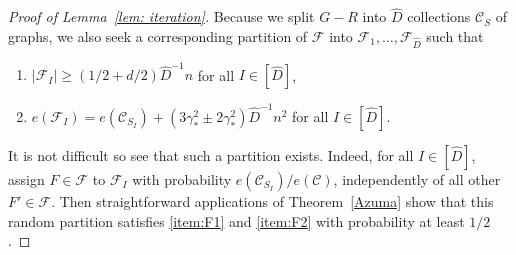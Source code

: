 \documentclass[a4paper, 11pt, reqno]{amsart}
\numberwithin{equation}{section}
\newcommand{\1}{{\rm 1\hspace*{-0.4ex}%
\rule{0.1ex}{1.52ex}\hspace*{0.2ex}}}
\newcommand{\cF}{\mathcal{F}}
\newcommand{\cC}{\mathcal{C}}
\newcommand{\I}{I}
\newcommand{\COMMENT}[1]{}
\begin{document}
\begin{proof}[Proof of Lemma~\ref{lem: iteration}]
Because we split $G- R$ into $\hat{D}$ collections $\cC_S$ of graphs, 
we also seek a corresponding partition of $\cF$ into $\cF_{1},\dots, \cF_{\hat{D}}$ such that 
\begin{enumerate}[label=(F\arabic*)]
\item\label{item:F1} $|\cF_{\I}|\geq (1/2+d/2)\hat{D}^{-1}n$ for all $\I\in [\hat{D}]$,
\item\label{item:F2} $e(\cF_{\I}) = e(\cC_{S_\I}) + (3\gamma_*^2 \pm 2\gamma_*^2)\hat{D}^{-1} n^2$ for all $\I\in [\hat{D}]$.
\end{enumerate}
It is not difficult so see that such a partition exists.
Indeed, for all $\I\in [\hat{D}]$, 
assign $F\in \cF$ to $\cF_\I$ with probability $e(\cC_{S_\I})/e(\cC)$, independently of all other $F'\in \cF$.
Then straightforward applications of Theorem~\ref{Azuma} show that this random partition satisfies \ref{item:F1} and \ref{item:F2} with probability at least $1/2$.\COMMENT{
Fix some $c$ small enough.
Let $F_1,\dots, F_{|\cF|}$ be the forests and for each $j\in [|\cF|]$, let $x_j \in [\hat{D}]$ be a random variable such that $\mathbb{P}[x_j=\I] = e(\cC_{S_\I})/e(\cC)$ such that $x_1,\dots, x_{|\cF|}$ are independent random variables.
And we assign $F_j$ into $\cF_{x_j}$.
We fix $\I\in [\hat{D}]$ consider exposure martingales $X_j:= \mathbb{E}[e(\cF_\I)\mid x_1,\dots, x_{j-1}]$ and $Y_j:= \mathbb{E}[|\cF_\I|\mid x_1,\dots, x_{j-1}]$.
Note that
\begin{align*}
	e(\cF)=e(G)+e(H_1)+e(H_2)+(3\gamma_*^2\pm\gamma_*^2)n^2
	= e(G) +(3\gamma_*^2\pm \gamma_*^2 \pm \gamma_*^3)n^2
	=e(\cC)+(3\gamma_*^2\pm \gamma_*^2 \pm 2\gamma_*^3)n^2.
\end{align*}
Then 
\begin{align*}
	X_1 
	= e(\cC_{S_\I}) + (3\gamma_*^2\pm\gamma_*^2\pm 2\gamma_*^3)n^2\frac{e(\cC_{S_\I})}{e(\cC)}
	= e(\cC_{S_\I}) + (3\gamma_*^2\pm\gamma_*^2\pm 2\gamma_*^3)(1\pm \beta^{1/15})n^2/\hat{D}= e(\cC_{S_\I}) + (3\gamma_*^2\pm 3\gamma_*^2/2)n^2/\hat{D},\\
	Y_1= \frac{e(\cC_{S_\I})}{e(\cC)}|\cF| 
	=
	\frac{(1\pm \beta^{1/15})}{\hat{D}}|\cF| \stackrel{({\rm f}1)}{\geq} (1+ 2d/3)\hat{D}^{-1} n.
\end{align*}
Also note that $X_i$ is $n$-Lipschitz and $Y_i$ is $1$-Lipschitz. 
Thus by Theorem~\ref{Azuma}, and the fact that $|\cF|\leq \alpha n/\gamma$ by \ref{item:T2},\ref{item:T3}
$$\mathbb{P}[X_{|\cF|}  
= e(\cC_{S_\I})+ (3\gamma_*^2\pm 2\gamma_*^2)n^2/\hat{D}] 
\geq 1 - 2 e^{-\gamma_*^4 n^4/(8\hat{D}^2n^2|\cF|)} 
\geq 1- (1-c)^n.$$ 
Also $$\mathbb{P}[Y_{|\cF|} \geq (1+d/2)\hat{D}^{-1}n]\geq 1-(1-c)^n.$$
Thus taking union bound gives us the desired partition.
}


\end{proof}
\end{document}
